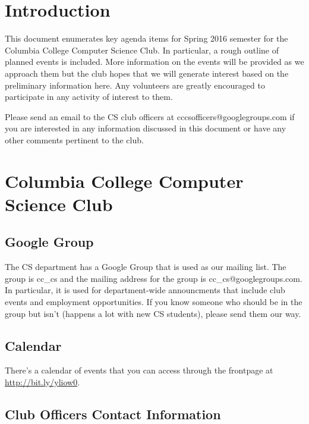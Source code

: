 

\renewcommand\TITLE{CCCS: Spring 2016 Agenda}


\topmatter


\section{Introduction}
\label{sec-1}

This document enumerates key agenda items for Spring 2016 semester for the
Columbia College Computer Science Club. In particular, a rough outline of
planned events is included. More information on the events will be provided as
we approach them but the club hopes that we will generate interest based on the
preliminary information here. Any volunteers are greatly encouraged to
participate in any activity of interest to them.

Please send an email to the CS club officers at cccsofficers@googlegroups.com
if you are interested in any information discussed in this document or have any
other comments pertinent to the club.


\newpage


\section{Columbia College Computer Science Club}
\label{sec-2}

\subsection{Google Group}
\label{sec-2-1}

The CS department has a Google Group that is used as our mailing list. The
group is cc\_cs and the mailing address for the group is cc\_cs@googlegroups.com.
In particular, it is used for department-wide announcments that include club
events and employment opportunities. If you know someone who should be in the
group but isn't (happens a lot with new CS students), please send them our way.

\subsection{Calendar}
\label{sec-2-2}

There's a calendar of events that you can access through the frontpage at
\url{http://bit.ly/yliow0}.

\newpage

\subsection{Club Officers Contact Information}
\label{sec-2-3}


